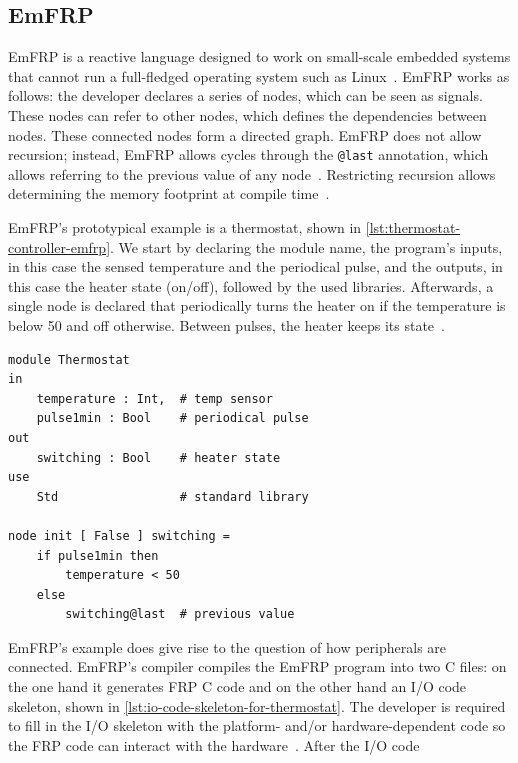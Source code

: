 \documentclass[a4paper]{book}
\begin{document}
\subsection{EmFRP}
\label{sec:emfrp}
EmFRP is a reactive language designed to work on small-scale embedded systems
that cannot run a full-fledged operating system such as
Linux~\cite{sawada2016emfrp}. EmFRP works as follows: the developer declares a
series of nodes, which can be seen as signals. These nodes can refer to other
nodes, which defines the dependencies between nodes. These connected nodes form
a directed graph. EmFRP does not allow recursion; instead, EmFRP allows cycles
through the \texttt{@last} annotation, which allows referring to the previous
value of any node~\cite{sawada2016emfrp}. Restricting recursion allows
determining the memory footprint at compile time~\cite{sawada2016emfrp}.
\par
EmFRP's prototypical example is a thermostat, shown in
\cref{lst:thermostat-controller-emfrp}. We start by declaring the module name,
the program's inputs, in this case the sensed temperature and the periodical
pulse, and the outputs, in this case the heater state (on/off), followed by the
used libraries. Afterwards, a single node is declared that periodically turns
the heater on if the temperature is below 50 and off otherwise. Between pulses,
the heater keeps its state~\cite{sawada2016emfrp}.
\begin{listing}[ht]
	\begin{lstlisting}[language=emfrp]
module Thermostat
in
    temperature : Int,  # temp sensor
    pulse1min : Bool    # periodical pulse
out
    switching : Bool    # heater state
use
    Std                 # standard library

node init [ False ] switching =
    if pulse1min then
        temperature < 50
    else
        switching@last  # previous value\end{lstlisting}
	\caption{Thermostat controller in EmFRP~\cite{sawada2016emfrp}}
	\label{lst:thermostat-controller-emfrp}
\end{listing}
\par
EmFRP's example does give rise to the question of how peripherals are connected.
EmFRP's compiler compiles the EmFRP program into two C files: on the one hand it
generates FRP C code and on the other hand an I/O code skeleton, shown in
\cref{lst:io-code-skeleton-for-thermostat}. The developer is required to fill in
the I/O skeleton with the platform- and/or hardware-dependent code so the FRP
code can interact with the hardware~\cite{sawada2016emfrp}. After the I/O code
\end{document}
